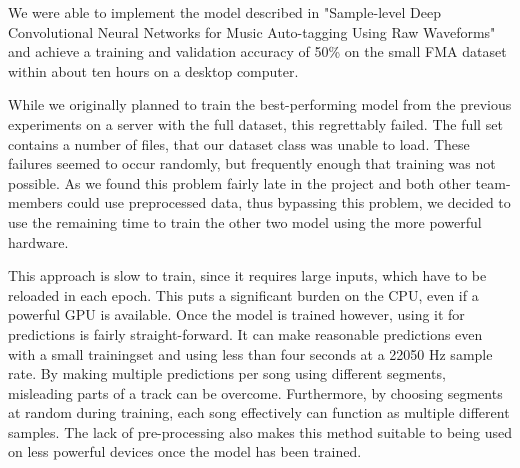We were able to implement the model described in "Sample-level Deep Convolutional Neural Networks for Music Auto-tagging Using Raw Waveforms" \cite{DBLP:journals/corr/LeePKN17} and achieve a training and validation accuracy of 50\% on the small FMA dataset \cite{fma_dataset} within about ten hours on a desktop computer.

While we originally planned to train the best-performing model from the previous experiments on a server with the full dataset, this regrettably failed. The full set contains a number of files, that our dataset class was unable to load. These failures seemed to occur randomly, but frequently enough that training was not possible. As we found this problem fairly late in the project and both other team-members could use preprocessed data, thus bypassing this problem, we decided to use the remaining time to train the other two model using the more powerful hardware.

This approach is slow to train, since it requires large inputs, which have to be reloaded in each epoch. This puts a significant burden on the CPU, even if a powerful GPU is available.
Once the model is trained however, using it for predictions is fairly straight-forward. It can make reasonable predictions even with a small trainingset and using less than four seconds at a 22050 Hz sample rate. By making multiple predictions per song using different segments, misleading parts of a track can be overcome. Furthermore, by choosing segments at random during training, each song effectively can function as multiple different samples. The lack of pre-processing also makes this method suitable to being used on less powerful devices once the model has been trained.